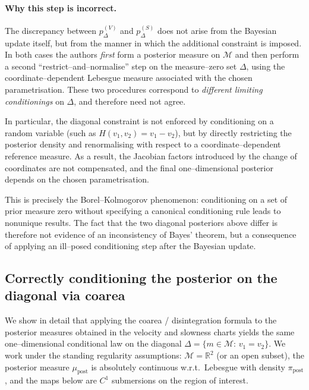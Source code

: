 \documentclass[11pt]{article}
\theoremstyle{remark}
\newcommand{\modelspace}{\mathcal{M}}
\begin{document}
\paragraph{Why this step is incorrect.}
The discrepancy between \(p^{(V)}_\Delta\) and \(p^{(S)}_\Delta\) does not arise
from the Bayesian update itself, but from the manner in which the additional
constraint is imposed. In both cases the authors \emph{first} form a posterior
measure on \(\modelspace\) and then perform a second ``restrict--and--normalise''
step on the measure--zero set \(\Delta\), using the coordinate--dependent
Lebesgue measure associated with the chosen parametrisation. These two
procedures correspond to \emph{different limiting conditionings} on \(\Delta\),
and therefore need not agree.

In particular, the diagonal constraint is not enforced by conditioning on a
random variable (such as \(H(v_1,v_2)=v_1-v_2\)), but by directly restricting the
posterior density and renormalising with respect to a coordinate--dependent
reference measure. As a result, the Jacobian factors introduced by the change of
coordinates are not compensated, and the final one--dimensional posterior
depends on the chosen parametrisation.

This is precisely the Borel--Kolmogorov phenomenon: conditioning on a set of
prior measure zero without specifying a canonical conditioning rule leads to
nonunique results. The fact that the two diagonal posteriors above differ is
therefore not evidence of an inconsistency of Bayes' theorem, but a consequence
of applying an ill--posed conditioning step after the Bayesian update.

\subsection{Correctly conditioning the posterior on the diagonal via coarea}
\label{subsec:coarea-diagonal-detailed}

We show in detail that applying the coarea / disintegration formula to the
posterior measures obtained in the velocity and slowness charts yields the same
one--dimensional conditional law on the diagonal
\(\Delta=\{m\in\modelspace:\,v_1=v_2\}\).  We work under the standing regularity
assumptions: \(\modelspace=\mathbb{R}^2\) (or an open subset), the posterior
measure \(\mu_{\mathrm{post}}\) is absolutely continuous w.r.t.\ Lebesgue with
density \(\pi_{\mathrm{post}}\), and the maps below are \(C^1\) submersions on
the region of interest.
\end{document}
